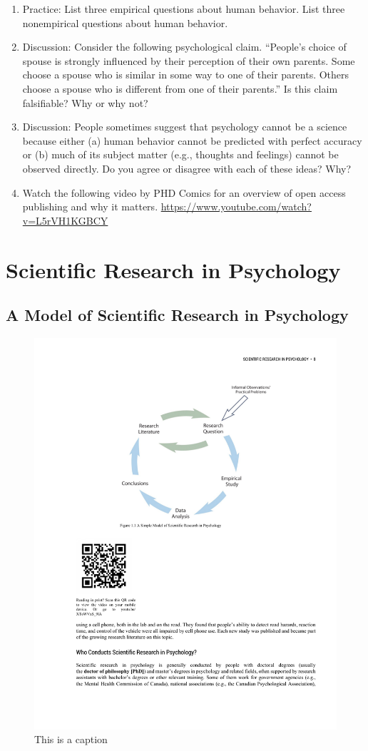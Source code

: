 \documentclass[]{book}
\theoremstyle{definition}
\theoremstyle{definition}
\theoremstyle{remark}
\begin{document}
\begin{enumerate}
\def\labelenumi{\arabic{enumi}.}
\item
  Practice: List three empirical questions about human behavior. List
  three nonempirical questions about human behavior.
\item
  Discussion: Consider the following psychological claim. ``People's
  choice of spouse is strongly influenced by their perception of their
  own parents. Some choose a spouse who is similar in some way to one of
  their parents. Others choose a spouse who is different from one of
  their parents.'' Is this claim falsifiable? Why or why not?
\item
  Discussion: People sometimes suggest that psychology cannot be a
  science because either (a) human behavior cannot be predicted with
  perfect accuracy or (b) much of its subject matter (e.g., thoughts and
  feelings) cannot be observed directly. Do you agree or disagree with
  each of these ideas? Why?
\item
  Watch the following video by PHD Comics for an overview of open access
  publishing and why it matters.
  \url{https://www.youtube.com/watch?v=L5rVH1KGBCY}
\end{enumerate}

\section{Scientific Research in
Psychology}\label{scientific-research-in-psychology}

\subsection{A Model of Scientific Research in
Psychology}\label{a-model-of-scientific-research-in-psychology}

\begin{figure}

{\centering \includegraphics[width=0.5\linewidth]{figures/C1Figure1} 

}

\caption{This is a caption}\label{fig:Theresearchcycle}
\end{figure}
\end{document}
